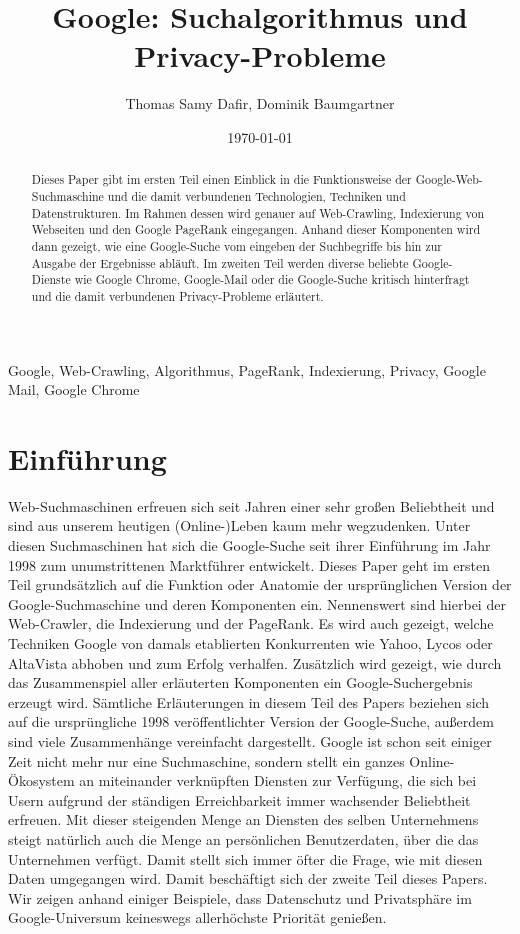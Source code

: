 \documentclass[12pt, a4paper]{llncs}
\title{Google: Suchalgorithmus und Privacy-Probleme}
\author{Thomas Samy Dafir, Dominik Baumgartner}
\institute{Wissenschaftliche Arbeitstechniken und Präsentation,\newline
	Fachbereich Computerwissenschaften,\newline Universität Salzburg}
\date{\selectlanguage{german}\today}
\begin{document}
	\maketitle
	\begin{abstract}
	Dieses Paper gibt im ersten Teil einen Einblick in die Funktionsweise der Google-Web-Suchmaschine und die 
	damit verbundenen Technologien, Techniken und Datenstrukturen. Im Rahmen dessen wird genauer auf Web-Crawling,
	Indexierung von Webseiten und den Google PageRank eingegangen. Anhand dieser Komponenten wird dann gezeigt, wie
	eine Google-Suche vom eingeben der Suchbegriffe bis hin zur Ausgabe der Ergebnisse abläuft.
	Im zweiten Teil werden diverse beliebte Google-Dienste wie Google Chrome, Google-Mail oder die Google-Suche
	kritisch hinterfragt und die damit verbundenen Privacy-Probleme erläutert.
	\end{abstract}
	\begin{small}
		\begin{keywords}
		Google, Web-Crawling, Algorithmus, PageRank, Indexierung, Privacy, Google Mail, Google Chrome
		\end{keywords}
	\end{small}
	
	\section{Einführung}
	Web-Suchmaschinen erfreuen sich seit Jahren einer sehr großen Beliebtheit und sind aus unserem heutigen (Online-)Leben kaum 
	mehr wegzudenken. Unter diesen Suchmaschinen hat sich die Google-Suche seit ihrer Einführung im Jahr 1998 zum 
	unumstrittenen Marktführer entwickelt. Dieses Paper geht im ersten Teil grundsätzlich auf die Funktion oder 
	Anatomie der ursprünglichen Version der Google-Suchmaschine und deren Komponenten ein. Nennenswert sind hierbei 
	der Web-Crawler, die Indexierung und der PageRank. Es wird auch gezeigt, welche Techniken Google von damals	etablierten
	Konkurrenten wie Yahoo, Lycos oder AltaVista abhoben und zum Erfolg verhalfen. Zusätzlich wird gezeigt, wie durch
	das Zusammenspiel aller erläuterten Komponenten ein Google-Suchergebnis erzeugt wird. Sämtliche Erläuterungen in
	diesem Teil des Papers beziehen sich auf die ursprüngliche 1998 veröffentlichter Version der Google-Suche, außerdem 
	sind viele Zusammenhänge vereinfacht dargestellt.\newline
	Google ist schon seit einiger Zeit nicht mehr nur eine Suchmaschine, sondern stellt ein ganzes Online-Ökosystem an
	miteinander verknüpften Diensten zur Verfügung, die sich bei Usern aufgrund der ständigen Erreichbarkeit immer 
	wachsender Beliebtheit erfreuen. Mit dieser steigenden Menge an Diensten des selben Unternehmens steigt natürlich 
	auch die Menge an persönlichen Benutzerdaten, über die das Unternehmen verfügt. Damit stellt sich immer öfter die Frage,
	wie mit diesen Daten umgegangen wird. Damit beschäftigt sich der zweite Teil dieses Papers. Wir zeigen anhand 
	einiger Beispiele, dass Datenschutz und Privatsphäre im Google-Universum keineswegs allerhöchste Priorität genießen.
	
\end{document}
